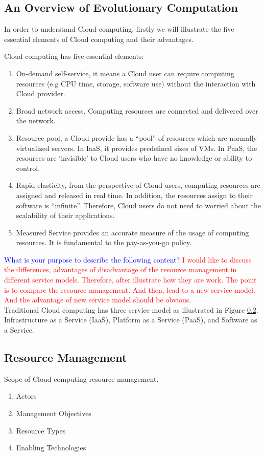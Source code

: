 \subsection{An Overview of Evolutionary Computation}


In order to understand Cloud computing, firstly we will illustrate the five essential elements of Cloud computing and their advantages.

Cloud computing has five essential elements:
\begin{enumerate}
 \item On-demand self-service, it means a Cloud user can require computing resources (e.g CPU time, storage, software use) without the interaction with Cloud provider.
 \item Broad network access, Computing resources are connected and delivered over the network.
 \item Resource pool, a Cloud provide has a ``pool'' of resources which are normally virtualized servers. In IaaS, it provides predefined sizes of VMs. In PaaS, the resources are `invisible' to Cloud users who have no knowledge or ability to control. 
 \item Rapid elasticity, from the perspective of Cloud users, computing resources are assigned and released in
real time. In addition, the resources assign to their software is ``infinite''. Therefore, Cloud users do not need to worried about the scalability of their applications.
 \item Measured Service provides an accurate measure of the usage of computing resources. It is fundamental to the pay-as-you-go policy.
\end{enumerate}

\textcolor{Blue}{What is your purpose to describe the following content?}
\textcolor{Red}{
	I would like to discuss the differences, advantages of disadvantage of the resource management in different service models. Therefore, after illustrate how they are work. The point is to compare the resource management. And then, lead to a new service model. And the advantage of new service model should be obvious. 
}\\
Traditional Cloud computing has three service model as illustrated in Figure \ref{}.
Infrastructure as a Service (IaaS), Platform as a Service (PaaS), and Software as a Service. 
\subsection{Resource Management}
Scope of Cloud computing resource management.
\begin{enumerate}
 \item Actors
 \item Management Objectives
 \item Resource Types
 \item Enabling Technologies
\end{enumerate}






